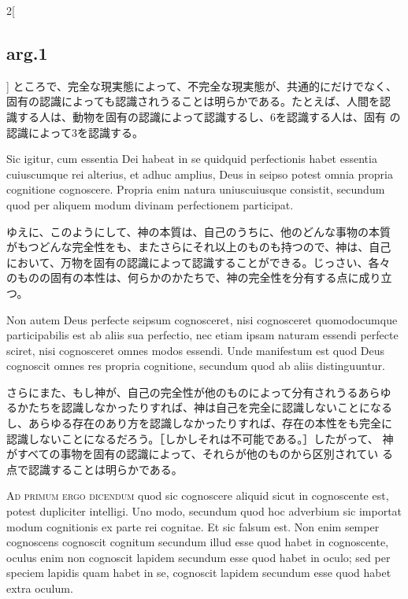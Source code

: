 \documentclass[paper=a4paper,fontsize=10pt,jafontsize=9pt,titlepage]{jlreq}
\begin{document}
\begin{paracol}{2}[\subsection{arg.1}]
ところで、完全な現実態によって、不完全な現実態が、共通的にだけでなく、
固有の認識によっても認識されうることは明らかである。たとえば、人間を認
識する人は、動物を固有の認識によって認識するし、6を認識する人は、固有
の認識によって3を認識する。

\switchcolumn*

Sic igitur, cum essentia Dei habeat in se quidquid perfectionis habet
essentia cuiuscumque rei alterius, et adhuc amplius, Deus in seipso
potest omnia propria cognitione cognoscere. Propria enim natura
uniuscuiusque consistit, secundum quod per aliquem modum divinam
perfectionem participat.

\switchcolumn

ゆえに、このようにして、神の本質は、自己のうちに、他のどんな事物の本質
がもつどんな完全性をも、またさらにそれ以上のものも持つので、神は、自己
において、万物を固有の認識によって認識することができる。じっさい、各々
のものの固有の本性は、何らかのかたちで、神の完全性を分有する点に成り立
つ。

\switchcolumn*

Non autem Deus perfecte seipsum cognosceret, nisi cognosceret
quomodocumque participabilis est ab aliis sua perfectio, nec etiam
ipsam naturam essendi perfecte sciret, nisi cognosceret omnes modos
essendi. Unde manifestum est quod Deus cognoscit omnes res propria
cognitione, secundum quod ab aliis distinguuntur.

\switchcolumn

さらにまた、もし神が、自己の完全性が他のものによって分有されうるあらゆ
るかたちを認識しなかったりすれば、神は自己を完全に認識しないことになる
し、あらゆる存在のあり方を認識しなかったりすれば、存在の本性をも完全に
認識しないことになるだろう。［しかしそれは不可能である。］したがって、
神がすべての事物を固有の認識によって、それらが他のものから区別されてい
る点で認識することは明らかである。

\switchcolumn*[\subsection{ad.1}]

{\scshape Ad primum ergo dicendum} quod sic cognoscere aliquid sicut
in cognoscente est, potest dupliciter intelligi. Uno modo, secundum
quod hoc adverbium sic importat modum cognitionis ex parte rei
cognitae. Et sic falsum est. Non enim semper cognoscens cognoscit
cognitum secundum illud esse quod habet in cognoscente, oculus enim
non cognoscit lapidem secundum esse quod habet in oculo; sed per
speciem lapidis quam habet in se, cognoscit lapidem secundum esse quod
habet extra oculum.


\end{paracol}
\end{document}
